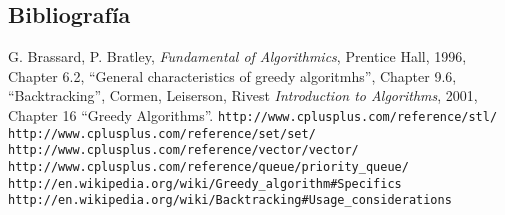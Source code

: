 \documentclass[11pt, a4paper, twoside]{article}
\begin{document}
\begin{TP1}
	\subsection{Bibliografía}
	\begin{thebibliography}{99}
		 G. Brassard, P. Bratley, \textit{Fundamental of Algorithmics}, Prentice Hall,  1996, Chapter 6.2, \enquote{General characteristics of greedy algoritmhs}, Chapter 9.6, \enquote{Backtracking}, 
		 Cormen, Leiserson, Rivest \textit{Introduction to Algorithms}, 2001, Chapter 16 \enquote{Greedy Algorithms}.
		 \texttt{http://www.cplusplus.com/reference/stl/}
		 \texttt{http://www.cplusplus.com/reference/set/set/}
		 \texttt{http://www.cplusplus.com/reference/vector/vector/}
		 \texttt{http://www.cplusplus.com/reference/queue/priority\_queue/}
		 \texttt{http://en.wikipedia.org/wiki/Greedy\_algorithm\#Specifics}
		 \texttt{http://en.wikipedia.org/wiki/Backtracking\#Usage\_considerations}
	\end{thebibliography}
	
	\clearpage{\pagestyle{empty}\clearpage} %

\end{TP1}
\end{document}
